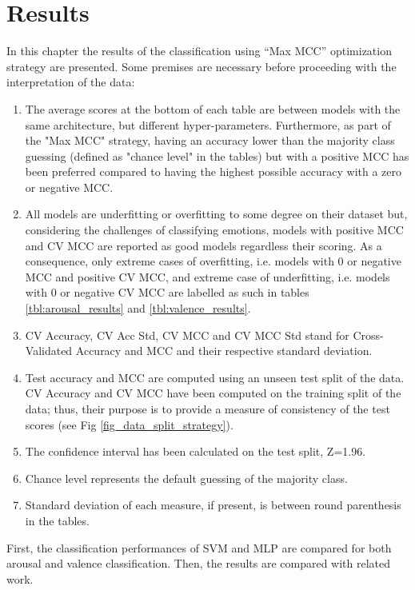 \chapter{Results}
\label{chap:results}
In this chapter the results of the classification using “Max MCC” optimization strategy are presented. Some premises are necessary before proceeding with the interpretation of the data:
\begin{enumerate}
\item 	The average scores at the bottom of each table are between models with the same architecture, but different hyper-parameters. Furthermore, as part of the "Max MCC" strategy, having an accuracy lower than the majority class guessing (defined as "chance level" in the tables) but with a positive \ac{MCC} has been preferred compared to having the highest possible accuracy with a zero or negative \ac{MCC}.
\item 	All models are underfitting or overfitting to some degree on their dataset but, considering the challenges of classifying emotions, models with positive \ac{MCC} and \ac{CV MCC} are reported as good models regardless their scoring. As a consequence, only extreme cases of overfitting, i.e. models with 0 or negative \ac{MCC} and positive \ac{CV MCC}, and extreme case of underfitting, i.e. models with 0 or negative \ac{CV MCC} are labelled as such in tables \ref{tbl:arousal_results} and \ref{tbl:valence_results}.
\item 	CV Accuracy, CV Acc Std, \ac{CV MCC} and CV MCC Std stand for Cross-Validated Accuracy and MCC and their respective standard deviation.
\item 	Test accuracy and \ac{MCC} are computed using an unseen test split of the data. CV Accuracy and \ac{CV MCC} have been computed on the training split of the data; thus, their purpose is to provide a measure of consistency of the test scores (see Fig \ref{fig_data_split_strategy}).
\item 	The confidence interval has been calculated on the test split, Z=1.96. 
\item 	Chance level represents the default guessing of the majority class.
\item 	Standard deviation of each measure, if present, is between round parenthesis in the tables.
\end{enumerate}

First, the classification performances of \ac{SVM} and \ac{MLP} are compared for both arousal and valence classification. Then, the results are compared with related work.

